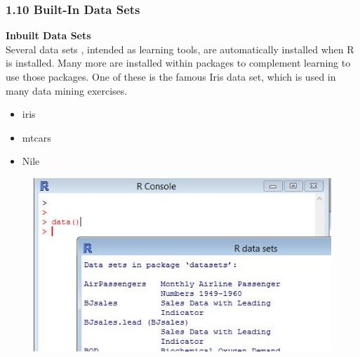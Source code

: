 \documentclass{beamer}
\begin{document}
 	
 	\begin{frame}
 		\frametitle{1.10 Built-In Data Sets}
 		\textbf{Inbuilt Data Sets}\\
 		Several data sets , intended as learning tools, are automatically installed when R is installed.
 		Many more are installed within packages to complement learning to use those packages. One
 		of these is the famous Iris data set, which is used in many data mining exercises.
 		
 		\begin{itemize}
 			\item iris
 			\item mtcars
 			\item Nile
 		\end{itemize}
 		
 		
 	\end{frame}
 	\begin{frame}
 		\begin{figure}
 			\centering
 			\includegraphics[width=1.2\linewidth]{images/Rdatasets}        
 		\end{figure}
 	\end{frame}   
\end{document}
